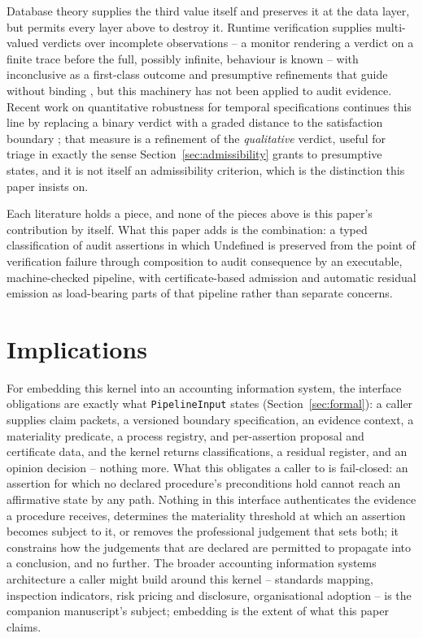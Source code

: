 \documentclass[smallcondensed,envcountsect,natbib]{svjour3}
\newcommand{\state}[1]{\textsf{#1}}
\begin{document}
Database theory supplies the third value itself \citep{codd1979} and preserves it at the data layer, but permits every layer above to destroy it. Runtime verification supplies multi-valued verdicts over incomplete observations -- a monitor rendering a verdict on a finite trace before the full, possibly infinite, behaviour is known -- with inconclusive as a first-class outcome and presumptive refinements that guide without binding \citep{bauer2011, bauer2010, leucker2009}, but this machinery has not been applied to audit evidence. Recent work on quantitative robustness for temporal specifications continues this line by replacing a binary verdict with a graded distance to the satisfaction boundary \citep{rino2026}; that measure is a refinement of the \emph{qualitative} verdict, useful for triage in exactly the sense Section~\ref{sec:admissibility} grants to presumptive states, and it is not itself an admissibility criterion, which is the distinction this paper insists on.

Each literature holds a piece, and none of the pieces above is this paper's contribution by itself. What this paper adds is the combination: a typed classification of audit assertions in which \state{Undefined} is preserved from the point of verification failure through composition to audit consequence by an executable, machine-checked pipeline, with certificate-based admission and automatic residual emission as load-bearing parts of that pipeline rather than separate concerns.

\section{Implications}
\label{sec:implications}

For embedding this kernel into an accounting information system, the interface obligations are exactly what \texttt{PipelineInput} states (Section~\ref{sec:formal}): a caller supplies claim packets, a versioned boundary specification, an evidence context, a materiality predicate, a process registry, and per-assertion proposal and certificate data, and the kernel returns classifications, a residual register, and an opinion decision -- nothing more. What this obligates a caller to is fail-closed: an assertion for which no declared procedure's preconditions hold cannot reach an affirmative state by any path. Nothing in this interface authenticates the evidence a procedure receives, determines the materiality threshold at which an assertion becomes subject to it, or removes the professional judgement that sets both; it constrains how the judgements that are declared are permitted to propagate into a conclusion, and no further. The broader accounting information systems architecture a caller might build around this kernel -- standards mapping, inspection indicators, risk pricing and disclosure, organisational adoption -- is the companion manuscript's subject; embedding is the extent of what this paper claims.
\end{document}
